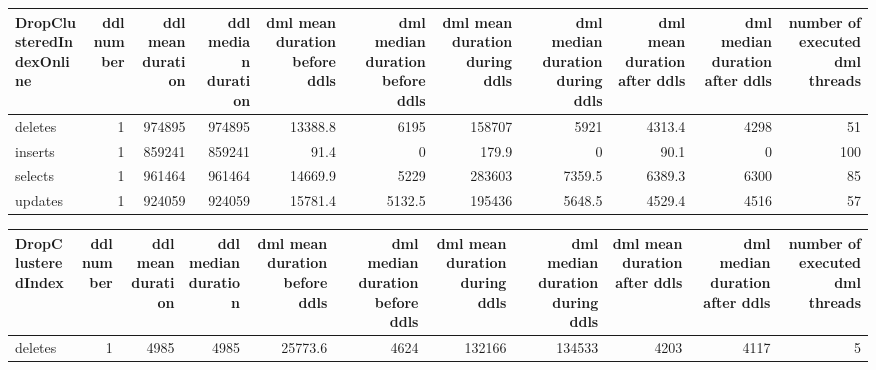 \begin{tabular}{lrrrrrrrrrr}
\hline
\end{tabular}\begin{tabular}{lrrrrrrrrrr}
\hline
 DropClusteredIndexOnline   &   ddl number &   ddl mean duration &   ddl median duration &   dml mean duration before ddls &   dml median duration before ddls &   dml mean duration during ddls &   dml median duration during ddls &   dml mean duration after ddls &   dml median duration after ddls &   number of executed dml threads \\
\hline
 deletes                    &            1 &              974895 &                974895 &                         13388.8 &                            6195   &                        158707   &                            5921   &                         4313.4 &                             4298 &                               51 \\
 inserts                    &            1 &              859241 &                859241 &                            91.4 &                               0   &                           179.9 &                               0   &                           90.1 &                                0 &                              100 \\
 selects                    &            1 &              961464 &                961464 &                         14669.9 &                            5229   &                        283603   &                            7359.5 &                         6389.3 &                             6300 &                               85 \\
 updates                    &            1 &              924059 &                924059 &                         15781.4 &                            5132.5 &                        195436   &                            5648.5 &                         4529.4 &                             4516 &                               57 \\
\hline
\end{tabular}\begin{tabular}{lrrrrrrrrrr}
\hline
 DropClusteredIndex   &   ddl number &   ddl mean duration &   ddl median duration &   dml mean duration before ddls &   dml median duration before ddls &   dml mean duration during ddls &   dml median duration during ddls &   dml mean duration after ddls &   dml median duration after ddls &   number of executed dml threads \\
\hline
 deletes              &            1 &                4985 &                  4985 &                         25773.6 &                              4624 &                        132166   &                            134533 &                         4203   &                             4117 &                                5 \\

\end{tabular}
